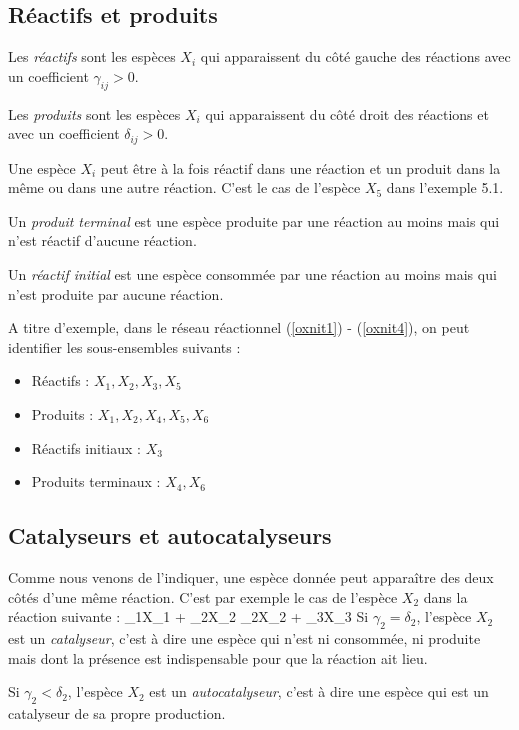 \subsection* {Réactifs et produits}

Les {\em réactifs} sont les espèces $X_i$ qui apparaissent du c\^oté
gauche  des réactions avec un coefficient $\gamma_{ij} > 0$.

Les {\em produits} sont les espèces $X_i$ qui apparaissent du c\^oté droit
des réactions et avec un coefficient $\delta_{ij} > 0$. 

Une espèce $X_i$ peut être à la fois réactif dans une réaction et un
produit dans la même ou dans une autre  réaction. C'est le cas de l'espèce $X_5$ dans l'exemple 5.1.

Un {\em produit terminal} est une espèce produite par une réaction au
moins mais qui n'est  réactif d'aucune réaction.

Un {\em réactif initial} est une espèce consommée par une réaction au
moins mais qui n'est  produite par aucune réaction. 

A titre d'exemple, dans le réseau réactionnel (\ref{oxnit1}) - (\ref{oxnit4}),
on peut identifier les sous-ensembles suivants : 
\begin{itemize} 
\item[] Réactifs : $X_1, X_2, X_3, X_5$ 
\item[] Produits : $X_1, X_2, X_4, X_5, X_6$ 
\item[] Réactifs initiaux : $X_3$ 
\item[] Produits terminaux : $X_4, X_6$ 
\end{itemize} 

\subsection* {Catalyseurs et autocatalyseurs}

Comme nous venons de l'indiquer, une espèce donnée peut apparaître
des deux côtés d'une même réaction. C'est par exemple le cas de
l'espèce $X_2$ dans la réaction suivante : \eqnn \gamma_1X_1 + \gamma_2X_2
\longrightarrow \delta_2X_2 + \delta_3X_3 \eeqnn Si $\gamma_2 = \delta_2$,
l'espèce $X_2$ est un {\em catalyseur}, c'est à dire une espèce  qui n'est ni
consommée, ni produite mais dont la présence est indispensable pour que la
réaction ait lieu.

Si $\gamma_2 < \delta_2$, l'espèce $X_2$ est un {\em autocatalyseur},
c'est à dire une espèce  qui est un catalyseur de sa propre production.

